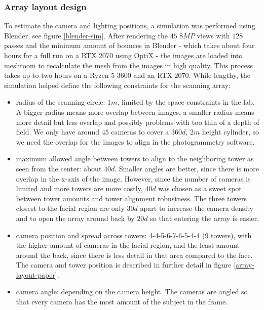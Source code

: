 	\subsubsection{Array layout design}
	To estimate the camera and lighting positions, a simulation was performed using Blender, see figure \ref{blender-sim}. After rendering the $45$ $8MP$ views with $128$ passes and the minimum amount of bounces in Blender - which takes about four hours for a full run on a RTX 2070 using OptiX - the images are loaded into meshroom to recalculate the mesh from the images in high quality. This process takes up to two hours on a Ryzen 5 3600 and an RTX 2070. While lengthy, the simulation helped define the following constraints for the scanning array:
	\begin{itemize}
		\item radius of the scanning circle: $1m$, limited by the space constraints in the lab. A bigger radius means more overlap between images, a smaller radius means more detail but less overlap and possibly problems with too thin of a depth of field. We only have around $45$ cameras to cover a $360d$, $2m$ height cylinder, so we need the overlap for the images to align in the photogrammetry software.
		\item maximum allowed angle between towers to align to the neighboring tower as seen from the center: about $40d$. Smaller angles are better, since there is more overlap in the x-axis of the image. However, since the number of cameras is limited and more towers are more costly, $40d$ was chosen as a sweet spot between tower amounts and tower alignment robustness. The three towers closest to the facial region are only $30d$ apart to increase the camera density and to open the array around back by $20d$ so that entering the array is easier.
		\item camera position and spread across towers: 4-4-5-6-7-6-5-4-4 (9 towers), with the higher amount of cameras in the facial region, and the least amount around the back, since there is less detail in that area compared to the face. The camera and tower position is described in further detail in figure \ref{array-layout-paper}.
		\item camera angle: depending on the camera height. The cameras are angled so that every camera has the most amount of the subject in the frame.
	\end{itemize}
	
